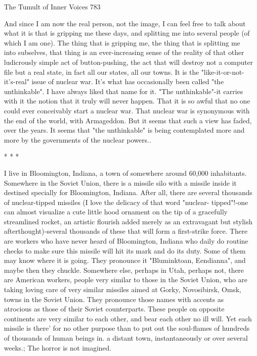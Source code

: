 The Tumult of Inner Voices                                                             783

        And since I am now the real person, not the image, I can feel free to talk about
what it is that is gripping me these days, and splitting me into several people (of
which I am one). The thing that is gripping me, the thing that is splitting me into
subselves, that thing is an ever-increasing sense of the reality of that other ludicrously
simple act of button-pushing, the act that will destroy not a computer file but a real
state, in fact all our states, all our towns. It is the "like-it-or-not-it's-real" issue of
nuclear war. It's what has occasionally been called "the unthinkable".
        I have always liked that name for it. "The unthinkable"-it carries with it the
notion that it truly will never happen. That it is so awful that no one could ever
conceivably start a nuclear war. That nuclear war is synonymous with the end of the
world, with Armageddon. But it seems that such a view has faded, over the years. It
seems that "the unthinkable" is being contemplated more and more by the
governments of the nuclear powers..

                                        *       *       *

        I live in Bloomington, Indiana, a town of somewhere around 60,000
inhabitants. Somewhere in the Soviet Union, there is a missile silo with a missile
inside it destined specially for Bloomington, Indiana. After all, there are several
thousands of nuclear-tipped missiles (I love the delicacy of that word "nuclear-
tipped"!-one can almost visualize a cute little hood ornament on the tip of a gracefully
streamlined rocket, an artistic flourish added merely as an extravagant but stylish
afterthought)-several thousands of these that will form a first-strike force. There are
workers who have never heard of Bloomington, Indiana who daily do routine checks
to make sure this missile will hit its mark and do its duty. Some of them may know
where it is going. They pronounce it "Bluminktoan, Eendianna", and maybe then they
chuckle.
        Somewhere else, perhaps in Utah, perhaps not, there are American workers,
people very similar to those in the Soviet Union, who are taking loving care of very
similar missiles aimed at Gorky, Novosibirsk, Omsk, towns in the Soviet Union. They
pronounce those names with accents as atrocious as those of their Soviet counterparts.
        These people on opposite continents are very similar to each other, and bear
each other no ill will. Yet each missile is there' for no other purpose than to put out
the soul-flames of hundreds of thousands of human beings in. a distant town,
instantaneously or over several weeks.; The horror is not imagined.

